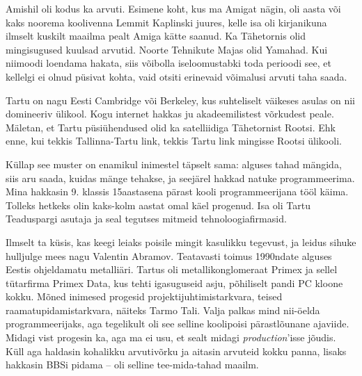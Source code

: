 Amishil oli kodus ka arvuti. Esimene koht, kus ma Amigat nägin, oli aasta või kaks noorema 
koolivenna Lemmit Kaplinski juures, kelle isa oli
kirjanikuna ilmselt kuskilt maailma pealt Amiga kätte saanud. Ka 
Tähetornis olid mingisugused kuulsad arvutid. 
Noorte Tehnikute Majas olid 
Yamahad. Kui niimoodi loendama hakata, siis võibolla 
iseloomustabki toda perioodi see, et kellelgi ei olnud püsivat kohta, vaid 
otsiti erinevaid võimalusi arvuti taha saada.


Tartu on nagu Eesti Cambridge või Berkeley, kus 
suhteliselt väikeses asulas on nii domineeriv ülikool. Kogu internet 
hakkas ju akadeemilistest võrkudest peale. Mäletan, et Tartu püsiühendused 
olid ka satelliidiga Tähetornist Rootsi. 
Ehk enne, kui tekkis Tallinna-Tartu link, tekkis Tartu link mingisse Rootsi 
ülikooli. 


Küllap see muster on enamikul inimestel täpselt sama: alguses 
tahad mängida, siis aru saada, kuidas mänge tehakse, ja seejärel hakkad natuke 
programmeerima. Mina hakkasin 9. klassis 15aastasena pärast kooli 
programmeerijana tööl käima. Tolleks hetkeks olin 
kaks-kolm aastat omal käel progenud. Isa oli Tartu 
Teaduspargi asutaja ja seal tegutses 
mitmeid tehnoloogiafirmasid. 

Ilmselt ta küsis, kas keegi leiaks poisile mingit kasulikku 
tegevust, ja leidus sihuke hulljulge mees nagu Valentin 
Abramov. Teatavasti toimus 1990ndate alguses 
Eestis ohjeldamatu metalliäri. Tartus oli metallikonglomeraat 
Primex ja sellel tütarfirma Primex Data, kus 
tehti igasuguseid asju, põhiliselt pandi PC kloone kokku. Mõned inimesed progesid projektijuhtimistarkvara, teised
raamatupidamistarkvara, näiteks Tarmo 
Tali. Valja palkas mind nii-öelda programmeerijaks, 
aga tegelikult oli see selline koolipoisi pärastlõunane ajaviide. Midagi 
vist progesin ka, aga ma ei usu, et sealt midagi \emph{production}'isse 
jõudis. Küll aga haldasin kohalikku arvutivõrku ja aitasin arvuteid kokku 
panna, lisaks hakkasin BBSi pidama -- oli selline tee-mida-tahad maailm.


